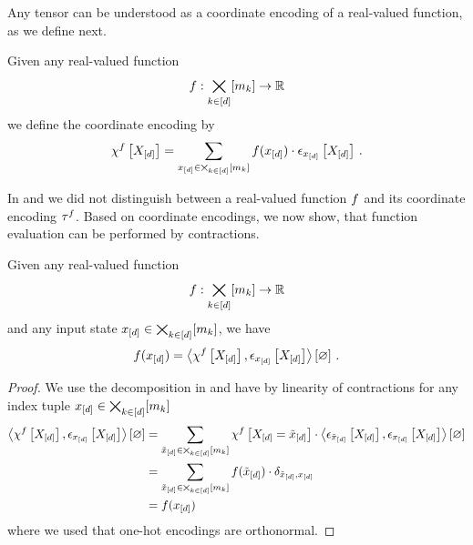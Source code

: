 Any tensor can be understood as a coordinate encoding of a real-valued function, as we define next.

\begin{definition}\label{def:coordinateEncoding}
    Given any real-valued function
    \begin{align*}
        f: \bigtimes_{k\in[d]}[m_{k}] \rightarrow \mathbb{R}
    \end{align*}
    we define the coordinate encoding by
    \begin{align*}
        \chi^{f}\left[X_{[d]}\right]
        = \sum_{x_{[d]}\in\bigtimes_{k\in[d]}[m_{k}]} f(x_{[d]}) \cdot \epsilon_{x_{[d]}}\left[X_{[d]}\right] \, .
    \end{align*}
\end{definition}

In  and  we did not distinguish between a real-valued function $f$ and its coordinate encoding $\tau^{f}$.
Based on coordinate encodings, we now show, that function evaluation can be performed by contractions.

\begin{theorem}
    \label{the:coordinateCalculus}
    Given any real-valued function
    \begin{align*}
        f : \bigtimes_{k\in[d]}[m_{k}] \rightarrow \mathbb{R}
    \end{align*}
    and any input state $x_{[d]}\in\bigtimes_{k\in[d]}[m_{k}]$, we have
    \begin{align*}
        f(x_{[d]})
        = \left\langle \chi^{f}\left[X_{[d]}\right],\epsilon_{x_{[d]}}\left[X_{[d]}\right]\right\rangle \left[ \varnothing \right] \, .
    \end{align*}
\end{theorem}
\begin{proof}
    We use the decomposition in  and have by linearity of contractions for any index tuple $x_{[d]}\in\bigtimes_{k\in[d]}[m_{k}]$
    \begin{align*}
        \left\langle \chi^{f}\left[X_{[d]}\right],\epsilon_{x_{[d]}}\left[X_{[d]}\right]\right\rangle \left[ \varnothing \right]
        & = \sum_{\tilde{x}_{[d]}\in\bigtimes_{k\in[d]}[m_{k}]}
        \chi^{f}\left[X_{[d]}=\tilde{x}_{[d]}\right]
        \cdot \left\langle \epsilon_{\tilde{x}_{[d]}}\left[X_{[d]}\right],\epsilon_{x_{[d]}}\left[X_{[d]}\right]\right\rangle \left[ \varnothing \right] \\
        & = \sum_{\tilde{x}_{[d]}\in\bigtimes_{k\in[d]}[m_{k}]}
        f(\tilde{x}_{[d]})
        \cdot \delta_{\tilde{x}_{[d]},x_{[d]}} \\
        & = f(x_{[d]})
    \end{align*}
    where we used that one-hot encodings are orthonormal.
\end{proof}

